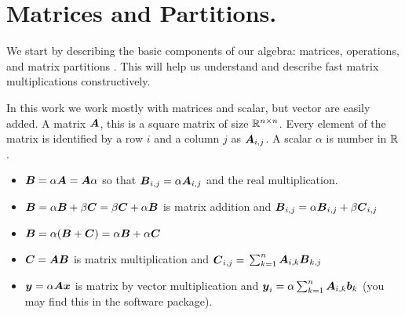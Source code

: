 \documentclass[acmsmall]{acmart}
\begin{document}
\section{Matrices and Partitions.}
\label{sec:matrices}
We start by describing the basic components of our algebra: matrices,
operations, and matrix partitions . This will help us understand and
describe fast matrix multiplications constructively.

In this work we work mostly with matrices and scalar, but vector are
easily added. A matrix ${\boldsymbol A}$, this is a square matrix of size
$\mathbb{R}^{n\times n}$. Every element of the matrix is identified by a row
$i$ and a column $j$ as ${\boldsymbol A}_{i,j}$. A scalar $\alpha$ is number in
$\mathbb{R}$.
\begin{itemize}
  \item ${\boldsymbol B} = \alpha{\boldsymbol A} = {\boldsymbol A}\alpha$ so that ${\boldsymbol B}_{i,j}
    = \alpha{\boldsymbol A}_{i,j}$ and the real multiplication.
  \item ${\boldsymbol B} = \alpha{\boldsymbol B} + \beta{\boldsymbol C}= \beta{\boldsymbol C} +
    \alpha{\boldsymbol B}$ is matrix addition and ${\boldsymbol B}_{i,j} =
    \alpha{\boldsymbol B}_{i,j} + \beta{\boldsymbol C}_{i,j}$
  \item ${\boldsymbol B} = \alpha({\boldsymbol B} + {\boldsymbol C}) = \alpha{\boldsymbol B} +
    \alpha{\boldsymbol C}$
  \item ${\boldsymbol C}= {\boldsymbol A}{\boldsymbol B}$ is matrix multiplication and ${\boldsymbol C}_{i,j}=$ 
    $\sum_{k=1}^n {\boldsymbol A}_{i,k}{\boldsymbol B}_{k,j}$
  \item ${\boldsymbol y}= \alpha{\boldsymbol A}{\boldsymbol x}$ is matrix by vector
    multiplication and ${\boldsymbol y}_{i}=\alpha \sum_{k=1}^n
    {\boldsymbol A}_{i,k}{\boldsymbol b}_{k}$ (you may find this in the software
    package).
\end{itemize}
\end{document}
